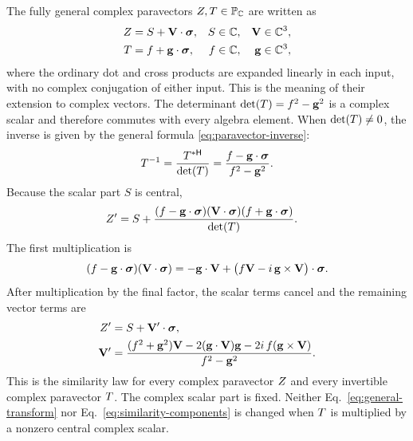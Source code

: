 The fully general complex paravectors
\(Z,T\in\mathbb{P}_{\mathbb{C}}\) are written as
\begin{align*}
Z&=S+\mathbf{V}\cdot\mathbf{\bm{\sigma}},
&S&\in\mathbb{C},
&\mathbf{V}&\in\mathbb{C}^3,\\
T&=f+\mathbf{g}\cdot\mathbf{\bm{\sigma}},
&f&\in\mathbb{C},
&\mathbf{g}&\in\mathbb{C}^3,
\end{align*}
where the ordinary dot and cross products are expanded linearly in each
input, with no complex conjugation of either input. This is the meaning of
their extension to complex vectors. The determinant
\(\operatorname{det}\!\left(T\right)=f^2-\mathbf{g}^2\) is a complex scalar and therefore commutes
with every algebra element. When
\(\operatorname{det}\!\left(T\right)\neq0\), the inverse is given by the general formula
\eqref{eq:paravector-inverse}:
\begin{equation*}
T^{-1}=\frac{T^{*\mathsf H}}{\operatorname{det}\!\left(T\right)}
=\frac{f-\mathbf{g}\cdot\mathbf{\bm{\sigma}}}{f^2-\mathbf{g}^2}.
\end{equation*}
Because the scalar part \(S\) is central,
\begin{align*}
Z'
&=S+\frac{(f-\mathbf{g}\cdot\mathbf{\bm{\sigma}})
 (\mathbf{V}\cdot\mathbf{\bm{\sigma}})(f+\mathbf{g}\cdot\mathbf{\bm{\sigma}})}{\operatorname{det}\!\left(T\right)}.
\end{align*}
The first multiplication is
\begin{equation*}
(f-\mathbf{g}\cdot\mathbf{\bm{\sigma}})(\mathbf{V}\cdot\mathbf{\bm{\sigma}})
=-\mathbf{g}\cdot\mathbf{V}
+\bigl(f\mathbf{V}-i\,\mathbf{g}\times\mathbf{V}\bigr)\cdot\mathbf{\bm{\sigma}}.
\end{equation*}
After multiplication by the final factor, the scalar terms cancel and the
remaining vector terms are
\begin{align}
Z'&=S+\mathbf{V}'\cdot\mathbf{\bm{\sigma}},\notag\\
\mathbf{V}'
&=\frac{(f^2+\mathbf{g}^2)\mathbf{V}
-2(\mathbf{g}\cdot\mathbf{V})\mathbf{g}
-2i\,f(\mathbf{g}\times\mathbf{V})}{f^2-\mathbf{g}^2}.
\label{eq:similarity-components}
\end{align}
This is the similarity law for every complex paravector \(Z\) and every
invertible complex paravector \(T\). The complex scalar part is fixed.
Neither Eq.\ \eqref{eq:general-transform} nor
Eq.\ \eqref{eq:similarity-components} is changed when \(T\) is multiplied
by a nonzero central complex scalar.

